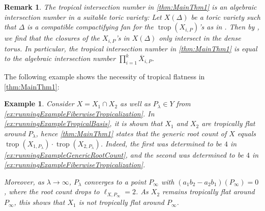 \documentclass[12pt,reqno,a4paper]{amsart}
\theoremstyle{theoremstyle}
\theoremstyle{examplestyle}
\newtheorem{example}[theorem]{Example}
\newtheorem{remark}[theorem]{Remark}
\theoremstyle{algorithmstyle}
\DeclareMathOperator{\trop}{trop}
\begin{document}
\begin{remark}
 The tropical intersection number in \cref{thm:MainThm1}
 is an algebraic intersection number in a suitable toric variety: %
 Let $X(\Delta)$ be a toric variety such that $\Delta$ is a compatible compactifying fan for the $\trop(X_{i,P})$'s as in \cite[Section~3]{OR2013}. Then by \cite[Proposition 3.12]{OR2013}, we find that the closures of the $X_{i,P}$'s in $X(\Delta)$ only intersect in the dense torus. In particular, the tropical intersection number in \cref{thm:MainThm1} is equal to the algebraic intersection number  $\prod_{i=1}^{k}\overline{X}_{i,P}$. %


%
\end{remark}

The following example shows the necessity of tropical flatness in \cref{thm:MainThm1}:

\begin{example}\label{exa:TropicallyFlatIllustration}
  Consider $X=X_1\cap X_2$ as well as $P_\lambda\in Y$ from \cref{ex:runningExampleFiberwiseTropicalization}.  In \cref{ex:runningExampleTropicalBasis}, it is shown that $X_{1}$ and $X_{2}$ are tropically flat around $P_\lambda$, hence \cref{thm:MainThm1} states that the generic root count of $X$ equals $\trop(X_{1,P_\lambda})\cdot \trop(X_{2,P_\lambda})$.  Indeed, the first was determined to be $4$ in \cref{ex:runningExampleGenericRootCount}, and the second was determined to be $4$ in \cref{ex:runningExampleFiberwiseTropicalization}.

  Moreover, as $\lambda\rightarrow\infty$, $P_\lambda$ converges to a point $P_\infty$ with $(a_1b_2-a_2b_1)(P_\infty)=0$, where the root count drops to $\ell_{X,P_\infty}=2$.  As $X_2$ remains tropically flat around $P_\infty$, this shows that $X_1$ is not tropically flat around $P_\infty$.
\end{example}
\end{document}

